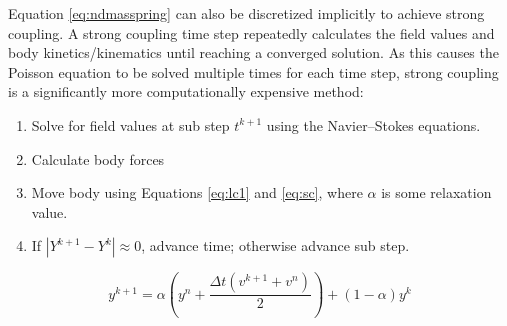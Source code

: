Equation \eqref{eq:ndmasspring} can also be discretized implicitly to achieve strong coupling.
A strong coupling time step repeatedly calculates the field values and body kinetics/kinematics until reaching a converged solution.
As this causes the Poisson equation to be solved multiple times for each time step, strong coupling is a significantly more computationally expensive method:
\begin{enumerate}
	\item Solve for field values at sub step $t^{k+1}$ using the Navier--Stokes equations.
	\item Calculate body forces
	\item Move body using Equations \eqref{eq:lc1} and \eqref{eq:sc}, where $\alpha$ is some relaxation value.
	\item If $|Y^{k+1}-Y^k| \approx 0$, advance time; otherwise advance sub step.
\end{enumerate}
\begin{equation}
y^{k+1} = \alpha \left(y^n+\frac{\Delta t\left(v^{k+1}+v^n\right)}{2}\right) +\left(1-\alpha\right)y^k\label{eq:sc}
\end{equation}

